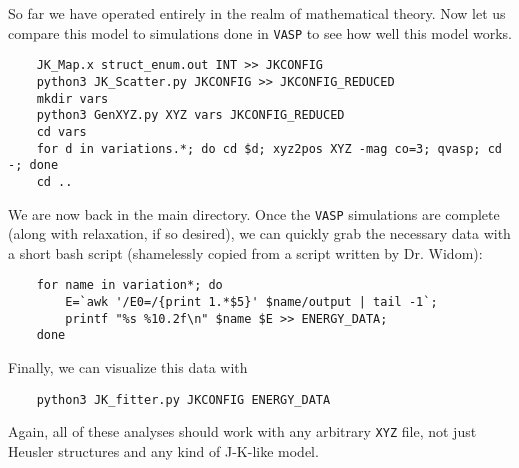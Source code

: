 \documentclass[12pt]{article}
\begin{document}
So far we have operated entirely in the realm of mathematical theory. Now let us compare this model to simulations done in \texttt{VASP} to see how well this model works.

\begin{verbatim}
    JK_Map.x struct_enum.out INT >> JKCONFIG
    python3 JK_Scatter.py JKCONFIG >> JKCONFIG_REDUCED
    mkdir vars
    python3 GenXYZ.py XYZ vars JKCONFIG_REDUCED
    cd vars
    for d in variations.*; do cd $d; xyz2pos XYZ -mag co=3; qvasp; cd -; done
    cd ..
\end{verbatim}

We are now back in the main directory. Once the \texttt{VASP} simulations are complete (along with relaxation, if so desired), we can quickly grab the necessary data with a short bash script (shamelessly copied from a script written by Dr. Widom):
\begin{verbatim}
    for name in variation*; do
        E=`awk '/E0=/{print 1.*$5}' $name/output | tail -1`;
        printf "%s %10.2f\n" $name $E >> ENERGY_DATA;
    done
\end{verbatim}
Finally, we can visualize this data with
\begin{verbatim}
    python3 JK_fitter.py JKCONFIG ENERGY_DATA
\end{verbatim}

Again, all of these analyses should work with any arbitrary \texttt{XYZ} file, not just Heusler structures and any kind of J-K-like model.
\end{document}

